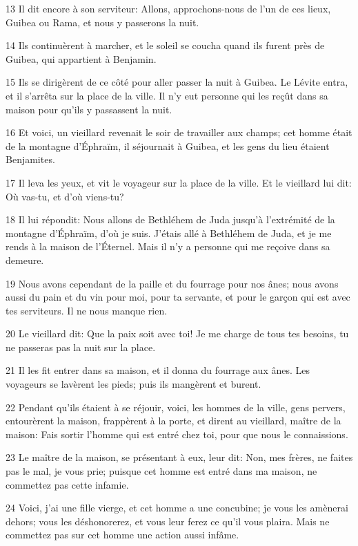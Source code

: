 \par 13 Il dit encore à son serviteur: Allons, approchons-nous de l'un de ces lieux, Guibea ou Rama, et nous y passerons la nuit.
\par 14 Ils continuèrent à marcher, et le soleil se coucha quand ils furent près de Guibea, qui appartient à Benjamin.
\par 15 Ils se dirigèrent de ce côté pour aller passer la nuit à Guibea. Le Lévite entra, et il s'arrêta sur la place de la ville. Il n'y eut personne qui les reçût dans sa maison pour qu'ils y passassent la nuit.
\par 16 Et voici, un vieillard revenait le soir de travailler aux champs; cet homme était de la montagne d'Éphraïm, il séjournait à Guibea, et les gens du lieu étaient Benjamites.
\par 17 Il leva les yeux, et vit le voyageur sur la place de la ville. Et le vieillard lui dit: Où vas-tu, et d'où viens-tu?
\par 18 Il lui répondit: Nous allons de Bethléhem de Juda jusqu'à l'extrémité de la montagne d'Éphraïm, d'où je suis. J'étais allé à Bethléhem de Juda, et je me rends à la maison de l'Éternel. Mais il n'y a personne qui me reçoive dans sa demeure.
\par 19 Nous avons cependant de la paille et du fourrage pour nos ânes; nous avons aussi du pain et du vin pour moi, pour ta servante, et pour le garçon qui est avec tes serviteurs. Il ne nous manque rien.
\par 20 Le vieillard dit: Que la paix soit avec toi! Je me charge de tous tes besoins, tu ne passeras pas la nuit sur la place.
\par 21 Il les fit entrer dans sa maison, et il donna du fourrage aux ânes. Les voyageurs se lavèrent les pieds; puis ils mangèrent et burent.
\par 22 Pendant qu'ils étaient à se réjouir, voici, les hommes de la ville, gens pervers, entourèrent la maison, frappèrent à la porte, et dirent au vieillard, maître de la maison: Fais sortir l'homme qui est entré chez toi, pour que nous le connaissions.
\par 23 Le maître de la maison, se présentant à eux, leur dit: Non, mes frères, ne faites pas le mal, je vous prie; puisque cet homme est entré dans ma maison, ne commettez pas cette infamie.
\par 24 Voici, j'ai une fille vierge, et cet homme a une concubine; je vous les amènerai dehors; vous les déshonorerez, et vous leur ferez ce qu'il vous plaira. Mais ne commettez pas sur cet homme une action aussi infâme.
